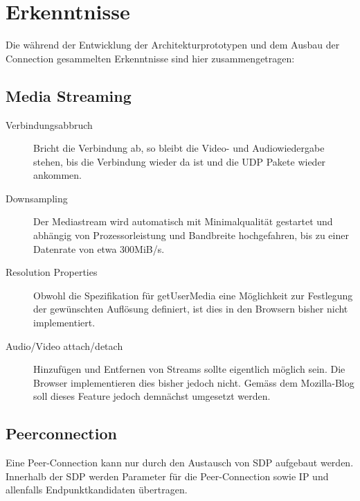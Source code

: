 \chapter{Erkenntnisse}
	Die während der Entwicklung der Architekturprototypen und dem Ausbau der Connection gesammelten Erkenntnisse sind hier zusammengetragen:

	\section{Media Streaming}
		\begin{description}
			\item[Verbindungsabbruch] Bricht die Verbindung ab, so bleibt die Video- und Audiowiedergabe stehen, bis die Verbindung wieder da ist und die UDP Pakete wieder ankommen.
		
			\item[Downsampling] Der Mediastream wird automatisch mit Minimalqualität gestartet und abhängig
	 		von Prozessorleistung und Bandbreite hochgefahren, bis zu einer Datenrate von etwa 300MiB/s.
	 		
	 		\item[Resolution Properties] Obwohl die Spezifikation für getUserMedia eine Möglichkeit zur Festlegung der gewünschten Auflösung definiert, ist dies in den Browsern bisher nicht implementiert.
	 		
	 		\item[Audio/Video attach/detach] Hinzufügen und Entfernen von Streams sollte eigentlich möglich sein. Die
	 		Browser implementieren dies bisher jedoch nicht. Gemäss dem Mozilla-Blog soll dieses Feature jedoch demnächst umgesetzt werden.
	 	\end{description}
	 	
	 \section{Peerconnection}
	 	Eine Peer-Connection kann nur durch den Austausch von SDP aufgebaut werden. Innerhalb der SDP werden Parameter für die Peer-Connection
	 	sowie IP und allenfalls Endpunktkandidaten übertragen.
	 	
